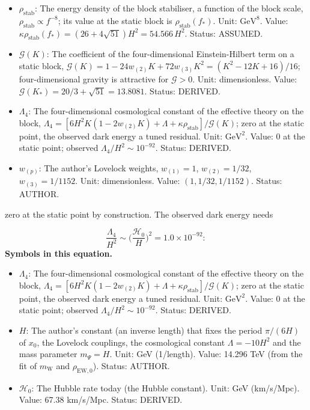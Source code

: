\documentclass[
  10pt,
]{article}
\providecommand{\tightlist}{%
  \setlength{\itemsep}{0pt}\setlength{\parskip}{0pt}}
\begin{document}
\begin{itemize}
\item
  \(\rho_{\mathrm{stab}}\): The energy density of the block stabiliser,
  a function of the block scale,
  \(\rho_{\mathrm{stab}} \propto f^{-8}\); its value at the static block
  is \(\rho_{\mathrm{stab}}(f_*)\). Unit: \(\mathrm{GeV}^{8}\). Value:
  \(\kappa\rho_{\mathrm{stab}}(f_*) = (26 + 4\sqrt{51})H^2 = 54.566\,H^2\).
  Status: ASSUMED.
\item
  \(\mathcal{G}(K)\): The coefficient of the four-dimensional
  Einstein-Hilbert term on a static block,
  \(\mathcal{G}(K) = 1 - 24w_{(2)}K + 72w_{(3)}K^2 = (K^2 - 12K + 16)/16\);
  four-dimensional gravity is attractive for \(\mathcal{G} > 0\). Unit:
  dimensionless. Value:
  \(\mathcal{G}(K_*) = 20/3 + \sqrt{51} = 13.8081\). Status: DERIVED.
\item
  \(\Lambda_4\): The four-dimensional cosmological constant of the
  effective theory on the block,
  \(\Lambda_4 = [6H^2K(1 - 2w_{(2)}K) + \Lambda + \kappa\rho_{\mathrm{stab}}]/\mathcal{G}(K)\);
  zero at the static point, the observed dark energy a tuned residual.
  Unit: \(\mathrm{GeV}^{2}\). Value: 0 at the static point; observed
  \(\Lambda_4/H^2 \sim 10^{-92}\). Status: DERIVED.
\item
  \(w_{(p)}\): The author's Lovelock weights, \(w_{(1)} = 1\),
  \(w_{(2)} = 1/32\), \(w_{(3)} = 1/1152\). Unit: dimensionless. Value:
  \((1, 1/32, 1/1152)\). Status: AUTHOR.
\end{itemize}

zero at the static point by construction. The observed dark energy needs

\[ \frac{\Lambda_4}{H^2} \sim \Big(\frac{\mathcal{H}_0}{H}\Big)^2 = 1.0\times10^{-92}: \]
\textbf{Symbols in this equation.}

\begin{itemize}
\tightlist
\item
  \(\Lambda_4\): The four-dimensional cosmological constant of the
  effective theory on the block,
  \(\Lambda_4 = [6H^2K(1 - 2w_{(2)}K) + \Lambda + \kappa\rho_{\mathrm{stab}}]/\mathcal{G}(K)\);
  zero at the static point, the observed dark energy a tuned residual.
  Unit: \(\mathrm{GeV}^{2}\). Value: 0 at the static point; observed
  \(\Lambda_4/H^2 \sim 10^{-92}\). Status: DERIVED.
\item
  \(H\): The author's constant (an inverse length) that fixes the period
  \(\pi/(6H)\) of \(x_0\), the Lovelock couplings, the cosmological
  constant \(\Lambda = -10H^2\) and the mass parameter \(m_\Psi = H\).
  Unit: GeV (1/length). Value: 14.296 TeV (from the fit of
  \(m_{\mathrm{W}}\) and \(\rho_{\mathrm{EW},0}\)). Status: AUTHOR.
\item
  \(\mathcal{H}_0\): The Hubble rate today (the Hubble constant). Unit:
  GeV (km/s/Mpc). Value: 67.38 km/s/Mpc. Status: DERIVED.
\end{itemize}
\end{document}
